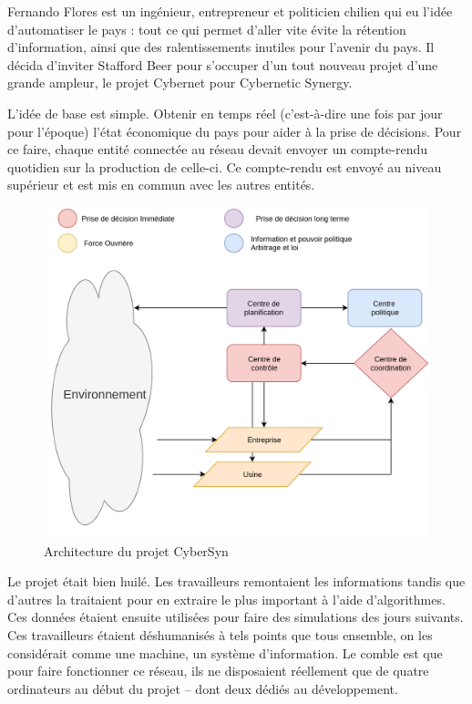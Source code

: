Fernando Flores est un ingénieur, entrepreneur et politicien chilien qui eu l'idée
d'automatiser le pays : tout ce qui permet d'aller vite évite la rétention d'information,
ainsi que des ralentissements inutiles pour l'avenir du pays.
Il décida d'inviter Stafford Beer pour s'occuper d'un tout nouveau projet d'une grande ampleur,
le projet Cybernet pour Cybernetic Synergy.

L'idée de base est simple. Obtenir en temps réel (c'est-à-dire une fois par jour pour l'époque)
l'état économique du pays pour aider à la prise de décisions.
Pour ce faire, chaque entité connectée au réseau devait envoyer un compte-rendu quotidien sur
la production de celle-ci. Ce compte-rendu est envoyé au niveau supérieur et est mis en commun
avec les autres entités.

\begin{figure}[h!]
  \centering
  \includegraphics[scale=0.20]{media/cybersyn.png}
  \caption{Architecture du projet CyberSyn}
\end{figure}

Le projet était bien huilé. Les travailleurs remontaient les informations
tandis que d'autres la traitaient pour en extraire le plus important à l'aide d'algorithmes.
Ces données étaient ensuite utilisées pour faire des simulations des jours suivants.
Ces travailleurs étaient déshumanisés à tels points que tous ensemble, on les considérait comme une machine, un système d'information.
Le comble est que pour faire fonctionner ce réseau, ils ne disposaient réellement que de quatre ordinateurs au début du projet – dont deux dédiés au développement.

